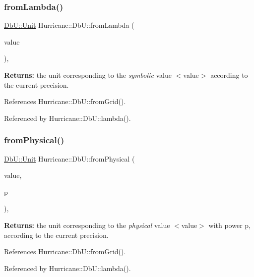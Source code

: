 \subsubsection{\texorpdfstring{from\+Lambda()}{fromLambda()}}
{\footnotesize\ttfamily \hyperlink{group__DbUGroup_ga4fbfa3e8c89347af76c9628ea06c4146}{Db\+U\+::\+Unit} Hurricane\+::\+Db\+U\+::from\+Lambda (\begin{DoxyParamCaption}\item[{double}]{value }\end{DoxyParamCaption})\hspace{0.3cm}{\ttfamily [inline]}, {\ttfamily [static]}}

{\bfseries Returns\+:} the unit corresponding to the {\itshape symbolic} value {\ttfamily $<$value$>$} according to the current precision. 

References Hurricane\+::\+Db\+U\+::from\+Grid().



Referenced by Hurricane\+::\+Db\+U\+::lambda().

\mbox{\label{group__DbUGroup_ga11d4dbd9134a19bda35cbacde1cb2769}} 
\subsubsection{\texorpdfstring{from\+Physical()}{fromPhysical()}}
{\footnotesize\ttfamily \hyperlink{group__DbUGroup_ga4fbfa3e8c89347af76c9628ea06c4146}{Db\+U\+::\+Unit} Hurricane\+::\+Db\+U\+::from\+Physical (\begin{DoxyParamCaption}\item[{double}]{value,  }\item[{\hyperlink{group__DbUGroup_ga50b5785bf4d75026c4c112caec3040a7}{Unit\+Power}}]{p }\end{DoxyParamCaption})\hspace{0.3cm}{\ttfamily [inline]}, {\ttfamily [static]}}

{\bfseries Returns\+:} the unit corresponding to the {\itshape physical} value {\ttfamily $<$value$>$} with power {\ttfamily p}, according to the current precision. 

References Hurricane\+::\+Db\+U\+::from\+Grid().



Referenced by Hurricane\+::\+Db\+U\+::lambda().

